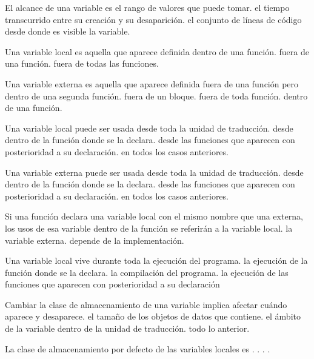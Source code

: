 \begin{preguntas}

\question El alcance de una variable es
\choice el rango de valores que puede tomar.
\choice el tiempo transcurrido entre su creación y su desaparición.
\correctchoice el conjunto de líneas de código desde donde es visible la variable.

\question Una variable local es aquella que aparece definida
\correctchoice dentro de una función.
\choice fuera de una función.
\choice fuera de todas las funciones.

\question Una variable externa es aquella que aparece definida
\choice fuera de una función pero dentro de una segunda función.
\choice fuera de un bloque.
\correctchoice fuera de toda función.
\choice dentro de una función.

\question Una variable local puede ser usada
\choice desde toda la unidad de traducción.
\correctchoice desde dentro de la función donde se la declara.
\choice desde las funciones que aparecen con posterioridad a su declaración.
\choice en todos los casos anteriores.

\question Una variable externa puede ser usada
\choice desde toda la unidad de traducción.
\choice desde dentro de la función donde se la declara.
\correctchoice desde las funciones que aparecen con posterioridad a su declaración.
\choice en todos los casos anteriores.

\question Si una función declara una variable local con el mismo nombre que una externa, los usos de esa variable dentro de la función se referirán a
\correctchoice la variable local.
\choice la variable externa.
\choice depende de la implementación.

\question Una variable local vive durante
\choice toda la ejecución del programa.
\correctchoice la ejecución de la función donde se la declara.
\choice la compilación del programa.
\choice la ejecución de las funciones que aparecen con posterioridad a su declaración

\question Cambiar la clase de almacenamiento de una variable implica afectar 
\correctchoice cuándo aparece y desaparece.
\choice el tamaño de los objetos de datos que contiene.
\choice el ámbito de la variable dentro de la unidad de traducción.
\choice todo lo anterior.

\question La clase de almacenamiento por defecto de las variables locales es
\correctchoice {}.
\choice {}.
\choice {}.
\choice {}.


\end{preguntas}
